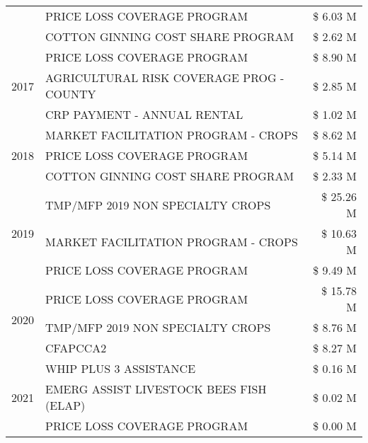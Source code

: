 \begin{tabular}{llr}
 & PRICE LOSS COVERAGE PROGRAM & \$ 6.03 M \\
 & COTTON GINNING COST SHARE PROGRAM & \$ 2.62 M \\
\cline{1-3}
\multirow[t]{3}{*}{2017} & PRICE LOSS COVERAGE PROGRAM & \$ 8.90 M \\
 & AGRICULTURAL RISK COVERAGE PROG - COUNTY & \$ 2.85 M \\
 & CRP PAYMENT - ANNUAL RENTAL & \$ 1.02 M \\
\cline{1-3}
\multirow[t]{3}{*}{2018} & MARKET FACILITATION PROGRAM - CROPS & \$ 8.62 M \\
 & PRICE LOSS COVERAGE PROGRAM & \$ 5.14 M \\
 & COTTON GINNING COST SHARE PROGRAM & \$ 2.33 M \\
\cline{1-3}
\multirow[t]{3}{*}{2019} & TMP/MFP 2019 NON SPECIALTY CROPS & \$ 25.26 M \\
 & MARKET FACILITATION PROGRAM - CROPS & \$ 10.63 M \\
 & PRICE LOSS COVERAGE PROGRAM & \$ 9.49 M \\
\cline{1-3}
\multirow[t]{3}{*}{2020} & PRICE LOSS COVERAGE PROGRAM & \$ 15.78 M \\
 & TMP/MFP 2019 NON SPECIALTY CROPS & \$ 8.76 M \\
 & CFAPCCA2 & \$ 8.27 M \\
\cline{1-3}
\multirow[t]{3}{*}{2021} & WHIP PLUS 3 ASSISTANCE & \$ 0.16 M \\
 & EMERG ASSIST LIVESTOCK BEES FISH (ELAP) & \$ 0.02 M \\
 & PRICE LOSS COVERAGE PROGRAM & \$ 0.00 M \\
\cline{1-3}
\bottomrule
\end{tabular}

